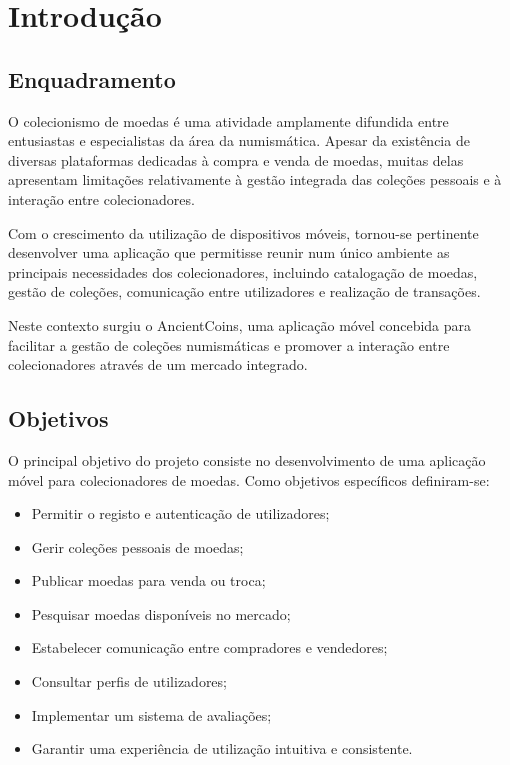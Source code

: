 \documentclass[12pt,a4paper]{article}
\begin{document}
\section{Introdução}

\subsection{Enquadramento}

O colecionismo de moedas é uma atividade amplamente difundida entre entusiastas e especialistas da área da numismática. Apesar da existência de diversas plataformas dedicadas à compra e venda de moedas, muitas delas apresentam limitações relativamente à gestão integrada das coleções pessoais e à interação entre colecionadores.

Com o crescimento da utilização de dispositivos móveis, tornou-se pertinente desenvolver uma aplicação que permitisse reunir num único ambiente as principais necessidades dos colecionadores, incluindo catalogação de moedas, gestão de coleções, comunicação entre utilizadores e realização de transações.

Neste contexto surgiu o AncientCoins, uma aplicação móvel concebida para facilitar a gestão de coleções numismáticas e promover a interação entre colecionadores através de um mercado integrado.

\subsection{Objetivos}

O principal objetivo do projeto consiste no desenvolvimento de uma aplicação móvel para colecionadores de moedas. Como objetivos específicos definiram-se:

\begin{itemize}
\setlength{\itemsep}{0.15em}
\item Permitir o registo e autenticação de utilizadores;
\item Gerir coleções pessoais de moedas;
\item Publicar moedas para venda ou troca;
\item Pesquisar moedas disponíveis no mercado;
\item Estabelecer comunicação entre compradores e vendedores;
\item Consultar perfis de utilizadores;
\item Implementar um sistema de avaliações;
\item Garantir uma experiência de utilização intuitiva e consistente.
\end{itemize}
\end{document}
